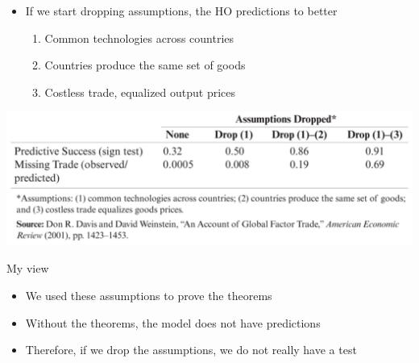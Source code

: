 \documentclass[ignorenonframetext,]{beamer}
\begin{document}
\begin{frame}

    \begin{itemize}
        \item If we start dropping assumptions, the HO predictions to better
        \begin{enumerate}
            \item Common technologies across countries 
            \item Countries produce the same set of goods
            \item Costless trade, equalized output prices
        \end{enumerate}
    \end{itemize}

    \includegraphics[scale=0.20]{davidweinstein.png}
\end{frame}

\begin{frame}{My view}

    \begin{itemize}
        \item We used these assumptions to prove the theorems
        \item Without the theorems, the model does not have predictions
        \item Therefore, if we drop the assumptions, we do not really have a test
    \end{itemize}

\end{frame}
\end{document}
